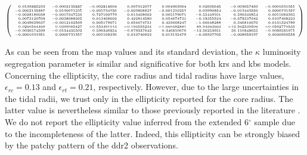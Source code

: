 $$
\tiny
\left(\begin{array}{rrrrrrrr}
0.0139885233 	 &  -0.0002135887  &-0.002818604  & 0.007312077     &0.004963964   &  0.02605645     &-0.003657460      &-0.0001631951\\
-0.0002135887 	 &  0.0130671231   &-0.001734756   & -0.003808827   &-0.001210257  &  0.03990854     &-0.013443550      &0.0006731357     \\        
-0.0028186038 	 & -0.0017347556   & 0.727100779   & 0.013468602    &0.005179071    & -0.55449101    & 0.596346854      &0.0011082365      \\           
0.0073120769 	 &   -0.0038088265 &  0.013468602  &  0.422814580   &0.054674731    & -0.19355524    & -0.679337642     & 0.0107408223     \\  
0.0049639637 	 &   -0.0012102569 &  0.005179071  &  0.054674731   &0.433668247    & -1.66048288    & 0.346810670      & 0.0131324789     \\      
0.0260564469 	 &   0.0399085427  & -0.554491013  &  -0.193555244  & -1.660482881 &  89.94363663   & -13.562539506   & -0.0592770535   \\        
-0.0036574599 	 &  -0.0134435502  &  0.596346854  & -0.679337642   & 0.346810670  &  -13.56253951  &   56.110848655  &  -0.0089581971   \\          
-0.0001631951 	 &   0.0006731357  & 0.001108236   & 0.010740822    & 0.013132479   &   -0.05927705  &    -0.008958197  &   0.0040960558    \\
\end{array}\right)
$$


As can be seen from the \gls{map} values and its standard deviation, the $\kappa$ luminosity segregation parameter is similar and significative for both \gls{krs} and \gls{kbs} models. Concerning the ellipticity, the core radius and tidal radius have large values, $\epsilon_{rc}= 0.13$ and $\epsilon_{rt}= 0.21$, respectively. However, due to the large uncertainties in the tidal radii, we trust only in the ellipticity reported for the core radius. The latter value is nevertheless similar to those previously reported in the literature \cite[0.17 and 0.1 to 0.35 reported by][respectively]{Raboud1998,Adams2001}. We do not report the ellipticity value inferred from the extended 6$^\circ$ sample due to the incompleteness of the latter. Indeed, this ellipticity can be strongly biased by the patchy pattern of the \gls{ddr2} observations.

